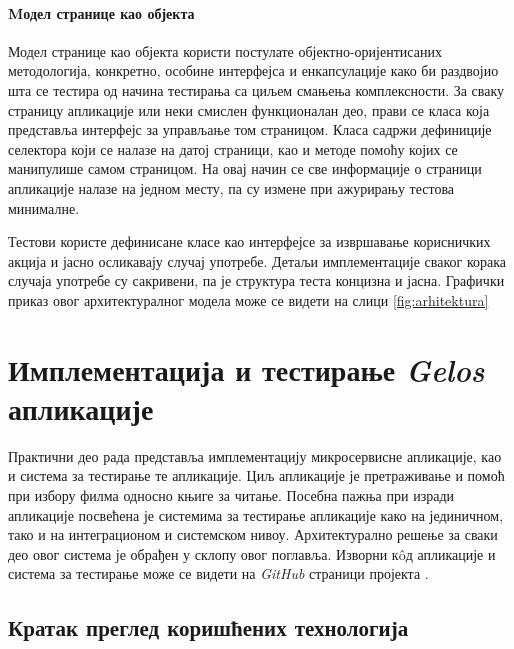 \documentclass[12pt,oneside]{memoir}
\begin{document}
\subsubsection{Mодел странице као објекта}

Модел странице као објекта користи постулате објектно-оријентисаних методологија, конкретно, особине интерфејса и енкапсулације како би раздвојио шта се тестира од начина тестирања са циљем смањења комплексности. 
За сваку страницу апликације или неки смислен функционалан део, прави се класа која представља интерфејс за управљање том страницом. Класа садржи дефиниције селектора који се налазе на датој страници, као и методе помоћу којих се манипулише самом страницом. На овај начин се све информације о страници апликације налазе на једном месту, па су измене при ажурирању тестова минималне. 

Тестови користе дефинисане класе као интерфејсе за извршавање корисничких акција и јасно осликавају случај употребе. Детаљи имплементације сваког корака случаја употребе су сакривени, па је структура теста концизна и јасна. Графички приказ овог архитектуралног модела може се видети на слици \ref{fig:arhitektura}





\chapter{Имплементација и тестирање \textit{Gelos} апликације}
\label{chp:aplikacija}
Практични део рада представља имплементацију микросервисне апликације, као и система за тестирање те апликације. Циљ апликације је претраживање и помоћ при избору филма односно књиге за читање. Посебна пажња при изради апликације посвећена је системима за тестирање апликације како на јединичном, тако и на интеграционом и системском нивоу. Архитектурално решење за сваки део овог система је обрађен у склопу овог поглавља. Изворни к\^{o}д апликације и система за тестирање може се видети на \textit{GitHub} страници пројекта \cite{projekat}.

\section{Кратак преглед коришћених технологија}
\label{chp:tehnologije}
\end{document}
